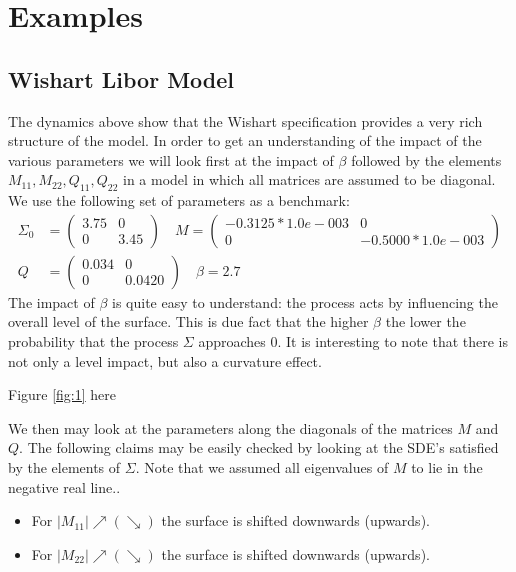 \section{Examples}
\subsection{Wishart Libor Model}
The dynamics above show that the Wishart specification provides a very rich structure of the model. In order to get an understanding of the impact of the various parameters we will look first at the impact of $\beta$ followed by the elements $M_{11},M_{22},Q_{11},Q_{22}$ in a model in which all matrices are assumed to be diagonal.
We use the following set of parameters as a benchmark:
\begin{align}
\Sigma_0&=\left(\begin{array}{cc} 3.75&0\\ 0&3.45\end{array}\right)\quad M=\left(\begin{array}{cc} -0.3125*1.0e-003&0\\ 0& -0.5000*1.0e-003\end{array}\right)\nonumber\\
Q&=\left(\begin{array}{cc} 0.034&0\\ 0&0.0420\end{array}\right)\quad \beta=2.7\nonumber
\end{align}
The impact of $\beta$ is quite easy to understand: the process acts by influencing the overall level of the surface. This is due fact that the higher $\beta$ the lower the probability that the process $\Sigma$ approaches 0. It is interesting to note that there is not only a level impact, but also a curvature effect.
\begin{center}
Figure \eqref{fig:1} here
\end{center}
We then may look at the parameters along the diagonals of the matrices $M$ and $Q$. The following claims may be easily checked by looking at the SDE's satisfied by the elements of $\Sigma$. Note that we assumed all eigenvalues of $M$ to lie in the negative real line.. 
\begin{itemize}
\item For $\left|M_{11}\right|\nearrow(\searrow)$ the surface is shifted downwards (upwards).
\item For $\left|M_{22}\right|\nearrow(\searrow)$ the surface is shifted downwards (upwards).
\end{itemize}
